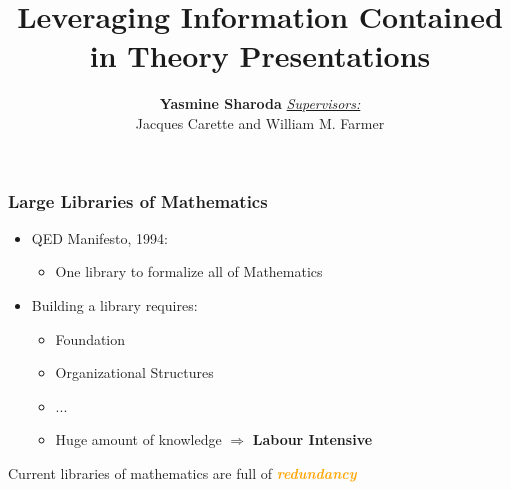 \documentclass[t,10pt,numbers,fleqn,usenames,xcolor=dvipsnames]{beamer}
\title{Leveraging Information Contained in Theory Presentations}
\author{\textbf{Yasmine Sharoda} \newline 
\newline \underline{\textit{Supervisors:}} \vspace{0.5em}\\ 
Jacques Carette and William M. Farmer}
\date{}
\begin{document}
    
\frame{\titlepage}


\begin{frame}[fragile] 
\frametitle{Large Libraries of Mathematics}
\begin{itemize}
\item QED Manifesto, 1994: 
\begin{itemize}
\item One library to formalize all of Mathematics 
\end{itemize}
\vspace{0.3cm}
\pause
\item Building a library requires: 
\begin{itemize}
\item Foundation 
\item Organizational Structures 
\item ... 
\item Huge amount of knowledge $\Rightarrow$ \textbf{Labour Intensive} 
\end{itemize}
\end{itemize}
\vfill 
\pause 
Current libraries of mathematics are full of \textcolor{Orange}{\textbf{\emph{redundancy}}}
\end{frame}

\end{document}
